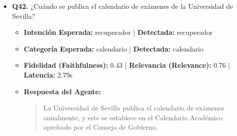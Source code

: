 \documentclass[12pt,a4paper,oneside]{report}
\begin{document}
\begin{itemize}
\begin{itemize}
\begin{quote}
No dude en preguntar si necesita más información.
                \end{quote}
          \item \textbf{{Ground Truth (Referencia):}} \\
                \begin{quote}
La US publica anualmente su propia convocatoria de ayudas sociales al estudio (transporte, matrícula, comedor), habitualmente a lo largo del mes de octubre de cada curso.
                \end{quote}
          \item \textbf{{Referencias / Fuentes Utilizadas:}} \\
                \begin{itemize}
                  \item \href{https://www.us.es/estudiar/becas-ayudas/becas-y-ayudas-de-formacion/propias}{Propias | Universidad de Sevilla}
                  \item R.R. NORMAS DE MATRICULA GRADO Y MASTER UNIVERSITARIO 2025-2026.pdf (Página 30)
                  \item BOJA25-508-00085-6229-01\_00319829.pdf (Página 10)
                  \item BOJA25-508-00085-6229-01\_00319829.pdf (Página 68)
                  \item R.R. NORMAS DE MATRICULA GRADO Y MASTER UNIVERSITARIO 2025-2026.pdf (Página 12)
                  \item \href{https://www.us.es/estudiar/becas-ayudas/ayudas-al-estudio/propias}{Propias | Universidad de Sevilla}
                  \item \href{https://www.us.es/estudiar/becas-ayudas/becas-asistenciales/propias}{Propias | Universidad de Sevilla}
                  \item \href{https://www.us.es/estudiar/becas-ayudas/becas-y-ayudas-de-movilidad/propias}{Propias | Universidad de Sevilla}
                \end{itemize}
        \end{itemize}

  
\item \textbf{Q42.} ¿Cuándo se publica el calendario de exámenes de la Universidad de Sevilla? \\
        \begin{itemize}
          \item \textbf{Intención Esperada:} recuperador | \textbf{Detectada:} recuperador
          \item \textbf{Categoría Esperada:} calendario | \textbf{Detectada:} calendario
          \item \textbf{Fidelidad (Faithfulness):} 0.43 | \textbf{Relevancia (Relevance):} 0.76 | \textbf{Latencia:} 2.79s
          \item \textbf{{Respuesta del Agente:}} \\
                \begin{quote}
La Universidad de Sevilla publica el calendario de exámenes anualmente, y este se establece en el Calendario Académico aprobado por el Consejo de Gobierno.


\end{quote}
\end{itemize}
\end{itemize}
\end{document}
